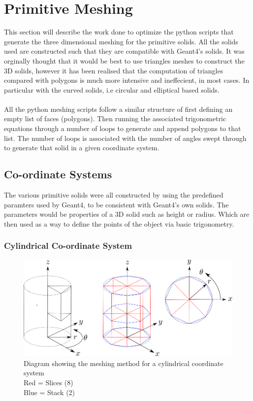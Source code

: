 \documentclass[12pt,a4paper]{article}
\begin{document}
\section{Primitive Meshing}
This section will describe the work done to optimize the python scripts that generate the three dimensional meshing for the primitive solids. All the solids used are constructed such that they are compatible with Geant4's solids. It was orginally thought that it would be best to use triangles meshes to construct the 3D solids, however it has been realised that the computation of triangles compared with polygons is much more intensive and ineffecient, in most cases. In particular with the curved solids, i.e circular and elliptical based solids.
\\\\
All the python meshing scripts follow a similar structure of first defining an empty list of faces (polygons). Then running the associated trigonometric equations through a number of loops to generate and append polygons to that list. The number of loops is associated with the number of angles swept through to generate that solid in a given coordinate system. 

\subsection{Co-ordinate Systems}
The various primitive solids were all constructed by using the predefined paramters used by Geant4, to be consistent with Geant4's own solids. The parameters would be properties of a 3D solid such as height or radius. Which are then used as a way to define the points of the object via basic trigonometry.\

\subsubsection{Cylindrical Co-ordinate System}

\begin{figure}[h!]
\centering
\includegraphics[scale=0.5]{Images//Coords//cyl.png}
\caption[width=\columnwidth]{Diagram showing the meshing method for a cylindrical coordinate system\\
Red = Slices (8)\\
Blue = Stack (2)}
\label{conts}
\end{figure}
\end{document}
